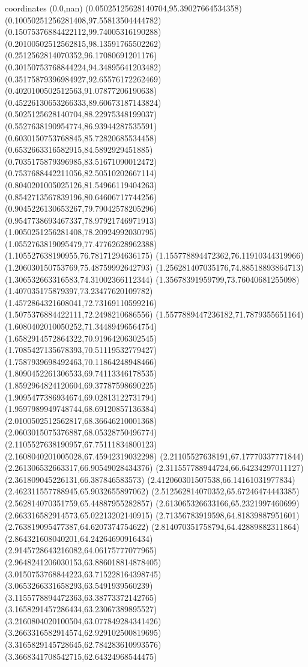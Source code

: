 coordinates {%
(0.0,nan)
(0.05025125628140704,95.39027664534358)
(0.10050251256281408,97.55813504444782)
(0.15075376884422112,99.74005316190288)
(0.20100502512562815,98.13591765502262)
(0.2512562814070352,96.17080691201176)
(0.30150753768844224,94.34895641203482)
(0.35175879396984927,92.65576172262469)
(0.4020100502512563,91.07877206190638)
(0.45226130653266333,89.60673187143824)
(0.5025125628140704,88.22975348199037)
(0.5527638190954774,86.93944287535591)
(0.6030150753768845,85.72820685534458)
(0.6532663316582915,84.5892929451885)
(0.7035175879396985,83.51671090012472)
(0.7537688442211056,82.50510202667114)
(0.8040201005025126,81.54966119404263)
(0.8542713567839196,80.64606717744256)
(0.9045226130653267,79.79042578205296)
(0.9547738693467337,78.97921746971913)
(1.0050251256281408,78.20924992030795)
(1.0552763819095479,77.47762628962388)
(1.105527638190955,76.78171294636175)
(1.155778894472362,76.11910344319966)
(1.206030150753769,75.48759992642793)
(1.256281407035176,74.88518893864713)
(1.306532663316583,74.31002366112344)
(1.35678391959799,73.76040681255098)
(1.407035175879397,73.23477620109782)
(1.4572864321608041,72.73169110599216)
(1.5075376884422111,72.2498210686556)
(1.5577889447236182,71.7879355651164)
(1.6080402010050252,71.34489496564754)
(1.6582914572864322,70.91964206302545)
(1.7085427135678393,70.51119532779427)
(1.7587939698492463,70.11864248948466)
(1.8090452261306533,69.74113346178535)
(1.8592964824120604,69.37787598690225)
(1.9095477386934674,69.02813122731794)
(1.9597989949748744,68.69120857136384)
(2.0100502512562817,68.36646210001368)
(2.0603015075376887,68.05328750496774)
(2.1105527638190957,67.75111834800123)
(2.1608040201005028,67.45942319032298)
(2.21105527638191,67.17770337771844)
(2.261306532663317,66.90549028434376)
(2.311557788944724,66.64234297011127)
(2.361809045226131,66.387846583573)
(2.412060301507538,66.14161031977834)
(2.462311557788945,65.9032655897062)
(2.512562814070352,65.67246474443385)
(2.562814070351759,65.44887955282857)
(2.613065326633166,65.2321997460699)
(2.663316582914573,65.02213202140915)
(2.71356783919598,64.81839887951601)
(2.763819095477387,64.6207374754622)
(2.814070351758794,64.42889882311864)
(2.864321608040201,64.24264690916434)
(2.9145728643216082,64.06175777077965)
(2.9648241206030153,63.886018814878405)
(3.0150753768844223,63.715228164398745)
(3.0653266331658293,63.5491939560239)
(3.1155778894472363,63.38773372142765)
(3.1658291457286434,63.23067389895527)
(3.2160804020100504,63.077849284341426)
(3.2663316582914574,62.929102500819695)
(3.3165829145728645,62.784283610993576)
(3.3668341708542715,62.64324968544475)
}

